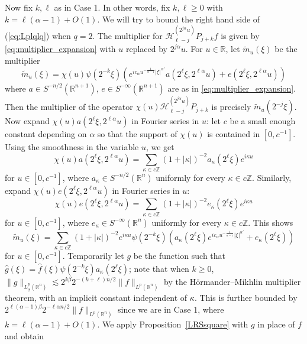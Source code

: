 \documentclass[12pt,leqno]{amsart}
\def\R{\mathbb{R}}
\def\Z{\mathbb{Z}}
\theoremstyle{plain}
\numberwithin{equation}{section}
\begin{document}
Now fix $k,\ell$ as in Case 1. In other words, fix $k,\ell \geq 0$ with $k = \ell(\alpha-1) + O(1)$. We will try to bound the right hand side of (\ref{eq:Lplqlq}) when $q = 2$. The multiplier for $\mathcal{H}^{(2^{j \alpha} u)}_{\ell-j} P_{j+k} f$ is given by \eqref{eq:multiplier_expansion} with $u$ replaced by $2^{j\alpha}u$. For $u \in \R$, let $\tilde{m}_u(\xi)$ be the multiplier  
\begin{equation} \label{eq:tildemu_def}
\tilde{m}_u(\xi) = \chi(u) \psi(2^{-k} \xi) \left( e^{i c_{\alpha} u^{-\frac{1}{\alpha-1}} |\xi|^{\alpha'}} a(2^{\ell} \xi, 2^{\ell \alpha} u) + 
e(2^{\ell} \xi, 2^{\ell \alpha} u) \right)
\end{equation}
where $a \in S^{-n/2}(\R^{n+1})$, $e \in S^{-\infty}(\R^{n+1})$ are as in \eqref{eq:multiplier_expansion}. Then the multiplier of the operator $\chi(u) \mathcal{H}^{(2^{j \alpha} u)}_{\ell-j} P_{j+k}$ is precisely $\tilde{m}_u(2^{-j} \xi)$.
Now expand $\chi(u) a(2^{\ell} \xi, 2^{\ell \alpha} u)$ in Fourier series in $u$: let $c$ be a small enough constant depending on $\alpha$ so that the support of $\chi(u)$ is contained in $[0,c^{-1}]$. Using the smoothness in the variable $u$, we get
\[
\chi(u) a(2^{\ell} \xi, 2^{\ell \alpha} u)
= \sum_{\kappa \in c \Z} (1+|\kappa|)^{-2} a_{\kappa}(2^{\ell} \xi) e^{i \kappa u}
\]
for $u \in [0,c^{-1}]$, where $a_{\kappa} \in S^{-n/2}(\R^n)$ uniformly for every $\kappa \in c \Z$. Similarly, expand $\chi(u) e(2^{\ell} \xi, 2^{\ell \alpha} u)$ in Fourier series in $u$:
\[
\chi(u) e(2^{\ell} \xi, 2^{\ell \alpha} u)
= \sum_{\kappa \in c \Z} (1+|\kappa|)^{-2} e_{\kappa}(2^{\ell} \xi) e^{i \kappa u}
\]
for $u \in [0,c^{-1}]$, where $e_{\kappa} \in S^{-\infty}(\R^n)$ uniformly for every $\kappa \in c \Z$.
This shows 
\[ 
\tilde{m}_u(\xi) = \sum_{\kappa \in c \Z} (1+|\kappa|)^{-2} e^{i \kappa u} \psi(2^{-k} \xi) \left(  a_{\kappa}(2^{\ell} \xi) e^{i c_{\alpha} u^{-\frac{1}{\alpha-1}} |\xi|^{\alpha'}} + e_{\kappa}(2^{\ell} \xi) \right)
\]
for $u \in [0,c^{-1}]$. Temporarily let $g$ be the function such that $\widehat{g}(\xi) = \widehat{f}(\xi) \psi(2^{-k} \xi) a_{\kappa}(2^{\ell} \xi)$; note that when $k \geq 0$, $\|g\|_{L^p_{\beta}(\R^n)} \lesssim 2^{k \beta} 2^{-(k+\ell) n/2} \|f\|_{L^p(\R^n)}$ by the H\"ormander--Mikhlin multiplier theorem, with an implicit constant independent of $\kappa$. This is further bounded by $2^{\ell (\alpha-1) \beta} 2^{-\ell \alpha n/2} \|f\|_{L^p(\R^n)}$ since we are in Case 1, where $k = \ell(\alpha-1) + O(1)$. We apply Proposition~\ref{LRSsquare} with $g$ in place of $f$ and obtain
\end{document}

